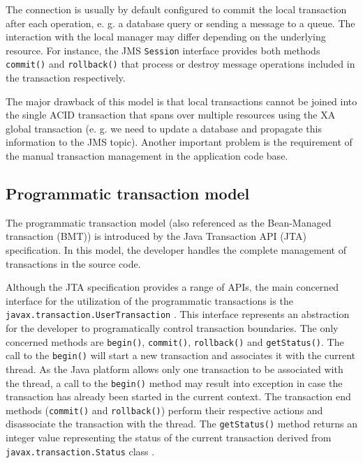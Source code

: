 \documentclass[oneside,
  digital, %
  table,   %
  lof,     %
  lot,     %
]{fithesis3}
\begin{document}
The connection is usually by default configured to commit the local transaction after each operation, e. g. a database query or sending a message to a queue. The interaction with the local manager may differ depending on the underlying resource. For instance, the JMS \texttt{Session} interface provides both methods \texttt{commit()} and \texttt{rollback()} that process or destroy message operations included in the transaction respectively.

The major drawback of this model is that local transactions cannot be joined into the single ACID transaction that spans over multiple resources using the XA global transaction \cite{java_transaction_design_strategies} (e. g. we need to update a database and propagate this information to the JMS topic). Another important problem is the requirement of the manual transaction management in the application code base.

\subsection{Programmatic transaction model}

The programmatic transaction model (also referenced as the Bean-Managed transaction (BMT)) is introduced by the Java Transaction API (JTA) specification. In this model, the developer handles the complete management of transactions in the source code.

Although the JTA specification provides a range of APIs, the main concerned interface for the utilization of the programmatic transactions is the \texttt{javax.transaction.UserTransaction} \cite{jta}. This interface represents an abstraction for the developer to programatically control transaction boundaries. The only concerned methods are \texttt{begin()}, \texttt{commit()}, \texttt{rollback()} and \texttt{getStatus()}. The call to the \texttt{begin()} will start a new transaction and associates it with the current thread. As the Java platform allows only one transaction to be associated with the thread, a call to the \texttt{begin()} method may result into exception in case the transaction has already been started in the current context. The transaction end methods (\texttt{commit()} and \texttt{rollback()}) perform their respective actions and disassociate the transaction with the thread. The \texttt{getStatus()} method returns an integer value representing the status of the current transaction derived from  \texttt{javax.transaction.Status} class \cite{jta}.
\end{document}
